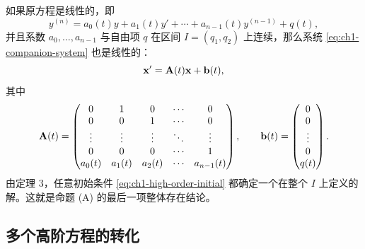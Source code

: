 如果原方程是线性的，即
\begin{equation}
 y^{(n)}
 =a_0(t)y+a_1(t)y'+\cdots+a_{n-1}(t)y^{(n-1)}+q(t),
 \label{eq:ch1-linear-high-order}
\end{equation}
并且系数 \(a_0,\ldots,a_{n-1}\) 与自由项 \(q\) 在区间 \(I=(q_1,q_2)\) 上连续，那么系统 \eqref{eq:ch1-companion-system} 也是线性的：
\begin{equation}
 \vect{x}'=\mat{A}(t)\vect{x}+\vect{b}(t),
 \label{eq:ch1-high-order-linear-system}
\end{equation}
其中
\begin{equation}
 \mat{A}(t)=
 \begin{pmatrix}
  0&1&0&\cdots&0\\
  0&0&1&\cdots&0\\
  \vdots&\vdots&\vdots&\ddots&\vdots\\
  0&0&0&\cdots&1\\
  a_0(t)&a_1(t)&a_2(t)&\cdots&a_{n-1}(t)
 \end{pmatrix},
 \qquad
 \vect{b}(t)=
 \begin{pmatrix}
  0\\
  0\\
  \vdots\\
  0\\
  q(t)
 \end{pmatrix}.
 \label{eq:ch1-companion-linear-data}
\end{equation}
由定理 3，任意初始条件 \eqref{eq:ch1-high-order-initial} 都确定一个在整个 \(I\) 上定义的解。这就是命题 (A) 的最后一项整体存在结论。

\subsection{多个高阶方程的转化}

